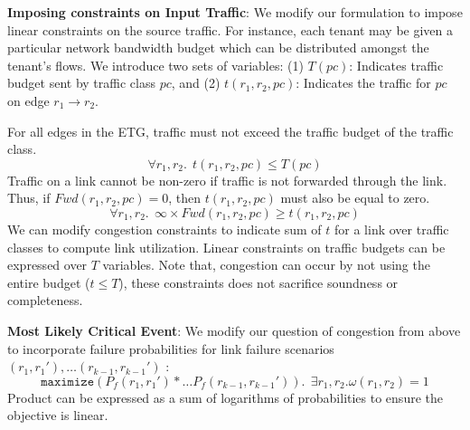\documentclass[]{article}
\begin{document}
\textbf{Imposing constraints on Input Traffic}: We modify our formulation to
impose linear constraints on the source traffic. For instance, each tenant may be
given a particular network bandwidth budget which can be distributed amongst the 
tenant's flows. 
We introduce two sets of variables: (1) $T(pc)$: Indicates traffic budget sent by traffic 
class $pc$, and (2) $t(r_1, r_2, pc)$: Indicates the traffic for $pc$ on edge 
$r_1 \rightarrow r_2$.

For all edges in the ETG, traffic must not exceed the traffic budget of the traffic class.
\begin{equation*}
	\forall r_1, r_2. ~~t(r_1, r_2, pc) \leq T(pc)
\end{equation*}
Traffic on a link cannot be non-zero if traffic is not forwarded through the link. Thus, 
if $Fwd(r_1,r_2,pc)=0$, then $t(r_1, r_2, pc)$ must also be equal to zero.
\begin{equation*}
	\forall r_1, r_2. ~~\infty \times Fwd(r_1, r_2, pc) \geq t(r_1, r_2, pc)
\end{equation*}
We can modify congestion constraints to indicate sum of $t$ for a link over traffic classes
to compute link utilization. Linear constraints on traffic budgets can be expressed over 
$T$ variables. Note that, congestion can occur by not using the entire budget ($t \leq T$), 
these constraints does not sacrifice soundness or completeness. 	


\textbf{Most Likely Critical Event}: We modify our question of congestion from above to
incorporate failure probabilities for link failure scenarios $(r_1, r_1'),\ldots(r_{k-1}, r_{k-1}')$ : 
\[
\texttt{maximize} (P_f(r_1,r_1') *\ldots P_f(r_{k-1}, r_{k-1}')). 
~~\exists r_1, r_2. \omega(r_1, r_2) = 1
\]
Product can be expressed as a sum of logarithms of probabilities to ensure the objective is linear. 

%

 
\begin{small}
	
\end{small}
\end{document}
